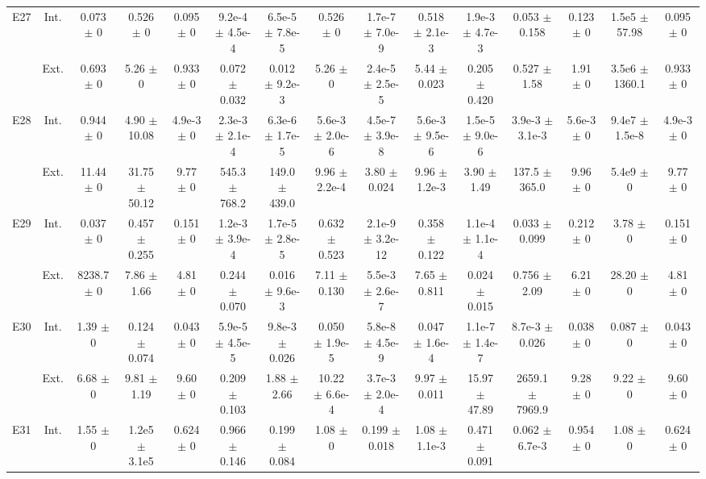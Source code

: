 \begin{table}[htbp]
{\begin{tabular}{@{}ccccccccccccccc@{}}
\cline{2-15}
\multirow{2}{*}{E27} & Int. & 0.073 $\pm$ 0 & 0.526 $\pm$ 0 & 0.095 $\pm$ 0 & 9.2e-4 $\pm$ 4.5e-4 & 6.5e-5 $\pm$ 7.8e-5 & 0.526 $\pm$ 0 & 1.7e-7 $\pm$ 7.0e-9 & 0.518 $\pm$ 2.1e-3 & 1.9e-3 $\pm$ 4.7e-3 & 0.053 $\pm$ 0.158 & 0.123 $\pm$ 0 & 1.5e5 $\pm$ 57.98 & 0.095 $\pm$ 0 \\
 & Ext. & 0.693 $\pm$ 0 & 5.26 $\pm$ 0 & 0.933 $\pm$ 0 & 0.072 $\pm$ 0.032 & 0.012 $\pm$ 9.2e-3 & 5.26 $\pm$ 0 & 2.4e-5 $\pm$ 2.5e-5 & 5.44 $\pm$ 0.023 & 0.205 $\pm$ 0.420 & 0.527 $\pm$ 1.58 & 1.91 $\pm$ 0 & 3.5e6 $\pm$ 1360.1 & 0.933 $\pm$ 0 \\
\cline{2-15}
\multirow{2}{*}{E28} & Int. & 0.944 $\pm$ 0 & 4.90 $\pm$ 10.08 & 4.9e-3 $\pm$ 0 & 2.3e-3 $\pm$ 2.1e-4 & 6.3e-6 $\pm$ 1.7e-5 & 5.6e-3 $\pm$ 2.0e-6 & 4.5e-7 $\pm$ 3.9e-8 & 5.6e-3 $\pm$ 9.5e-6 & 1.5e-5 $\pm$ 9.0e-6 & 3.9e-3 $\pm$ 3.1e-3 & 5.6e-3 $\pm$ 0 & 9.4e7 $\pm$ 1.5e-8 & 4.9e-3 $\pm$ 0 \\
 & Ext. & 11.44 $\pm$ 0 & 31.75 $\pm$ 50.12 & 9.77 $\pm$ 0 & 545.3 $\pm$ 768.2 & 149.0 $\pm$ 439.0 & 9.96 $\pm$ 2.2e-4 & 3.80 $\pm$ 0.024 & 9.96 $\pm$ 1.2e-3 & 3.90 $\pm$ 1.49 & 137.5 $\pm$ 365.0 & 9.96 $\pm$ 0 & 5.4e9 $\pm$ 0 & 9.77 $\pm$ 0 \\
\cline{2-15}
\multirow{2}{*}{E29} & Int. & 0.037 $\pm$ 0 & 0.457 $\pm$ 0.255 & 0.151 $\pm$ 0 & 1.2e-3 $\pm$ 3.9e-4 & 1.7e-5 $\pm$ 2.8e-5 & 0.632 $\pm$ 0.523 & 2.1e-9 $\pm$ 3.2e-12 & 0.358 $\pm$ 0.122 & 1.1e-4 $\pm$ 1.1e-4 & 0.033 $\pm$ 0.099 & 0.212 $\pm$ 0 & 3.78 $\pm$ 0 & 0.151 $\pm$ 0 \\
 & Ext. & 8238.7 $\pm$ 0 & 7.86 $\pm$ 1.66 & 4.81 $\pm$ 0 & 0.244 $\pm$ 0.070 & 0.016 $\pm$ 9.6e-3 & 7.11 $\pm$ 0.130 & 5.5e-3 $\pm$ 2.6e-7 & 7.65 $\pm$ 0.811 & 0.024 $\pm$ 0.015 & 0.756 $\pm$ 2.09 & 6.21 $\pm$ 0 & 28.20 $\pm$ 0 & 4.81 $\pm$ 0 \\
\cline{2-15}
\multirow{2}{*}{E30} & Int. & 1.39 $\pm$ 0 & 0.124 $\pm$ 0.074 & 0.043 $\pm$ 0 & 5.9e-5 $\pm$ 4.5e-5 & 9.8e-3 $\pm$ 0.026 & 0.050 $\pm$ 1.9e-5 & 5.8e-8 $\pm$ 4.5e-9 & 0.047 $\pm$ 1.6e-4 & 1.1e-7 $\pm$ 1.4e-7 & 8.7e-3 $\pm$ 0.026 & 0.038 $\pm$ 0 & 0.087 $\pm$ 0 & 0.043 $\pm$ 0 \\
 & Ext. & 6.68 $\pm$ 0 & 9.81 $\pm$ 1.19 & 9.60 $\pm$ 0 & 0.209 $\pm$ 0.103 & 1.88 $\pm$ 2.66 & 10.22 $\pm$ 6.6e-4 & 3.7e-3 $\pm$ 2.0e-4 & 9.97 $\pm$ 0.011 & 15.97 $\pm$ 47.89 & 2659.1 $\pm$ 7969.9 & 9.28 $\pm$ 0 & 9.22 $\pm$ 0 & 9.60 $\pm$ 0 \\
\cline{2-15}
\multirow{2}{*}{E31} & Int. & 1.55 $\pm$ 0 & 1.2e5 $\pm$ 3.1e5 & 0.624 $\pm$ 0 & 0.966 $\pm$ 0.146 & 0.199 $\pm$ 0.084 & 1.08 $\pm$ 0 & 0.199 $\pm$ 0.018 & 1.08 $\pm$ 1.1e-3 & 0.471 $\pm$ 0.091 & 0.062 $\pm$ 6.7e-3 & 0.954 $\pm$ 0 & 1.08 $\pm$ 0 & 0.624 $\pm$ 0 \\

\end{tabular}}
\end{table}
